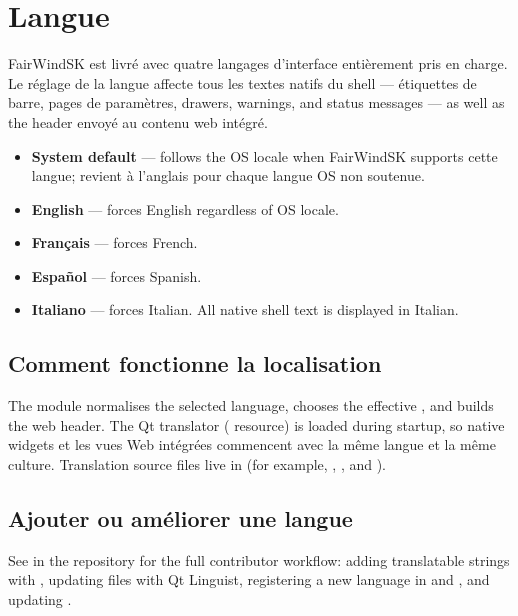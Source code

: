 \section{Langue}

FairWindSK est livré avec quatre langages d'interface entièrement pris en charge.
Le réglage de la langue affecte tous les textes natifs du shell --- étiquettes de barre, pages de paramètres,
drawers, warnings, and status messages --- as well as the 
header envoyé au contenu web intégré.

\begin{itemize}
  \item \textbf{System default} --- follows the OS locale when FairWindSK supports
cette langue; revient à l'anglais pour chaque langue OS non soutenue.
  \item \textbf{English} --- forces English regardless of OS locale.
  \item \textbf{Français} --- forces French.
  \item \textbf{Español} --- forces Spanish.
  \item \textbf{Italiano} --- forces Italian. All native shell text is displayed in Italian.
\end{itemize}

\subsection{Comment fonctionne la localisation}

The  module normalises the selected language, chooses the
effective , and builds the web  header.
The Qt translator ( resource) is loaded during startup, so native widgets
et les vues Web intégrées commencent avec la même langue et la même culture.
Translation source files live in  (for example,
, , and
).

\subsection{Ajouter ou améliorer une langue}

See  in the repository for the full contributor workflow:
adding translatable strings with , updating  files with
Qt Linguist, registering a new language in  and
, and updating .

